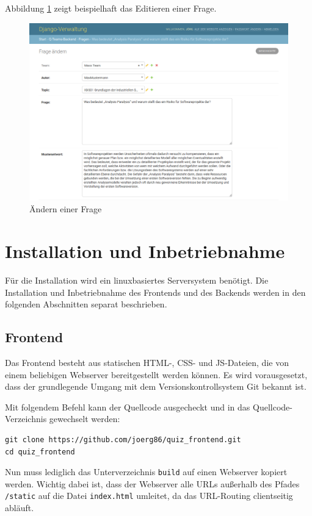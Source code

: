 \documentclass[a4paper,11pt,listof=numbered,glossary=totoc,parskip=half,toc=bib]{scrreprt}
\begin{document}
\begin{appendices}
	Abbildung \ref{fig:editfrage} zeigt beispielhaft das Editieren einer Frage.
	
	\begin{figure}
		\centering
		\includegraphics[width=\textwidth]{editfrage}
		\caption{Ändern einer Frage}
		\label{fig:editfrage}
	\end{figure}
	
	\chapter{Installation und Inbetriebnahme}
	Für die Installation wird ein linuxbasiertes Serversystem benötigt. Die Installation und Inbetriebnahme des Frontends und des Backends werden in den folgenden Abschnitten separat beschrieben.
	
	\section{Frontend}
	
	Das Frontend besteht aus statischen HTML-, CSS- und JS-Dateien, die von einem beliebigen Webserver bereitgestellt werden können.
	Es wird vorausgesetzt, dass der grundlegende Umgang mit dem Versionskontrollsystem Git bekannt ist.
	
	Mit folgendem Befehl kann der Quellcode ausgecheckt und in das Quellcode-Verzeichnis gewechselt werden:		
	\begin{verbatim}
git clone https://github.com/joerg86/quiz_frontend.git
cd quiz_frontend
	\end{verbatim}
	
	Nun muss lediglich das Unterverzeichnis \texttt{build} auf einen Webserver kopiert werden. Wichtig dabei ist, dass der Webserver alle URLs außerhalb des Pfades \texttt{/static} auf die Datei \texttt{index.html} umleitet, da das URL-Routing clientseitig abläuft.
	

\end{appendices}
\end{document}
